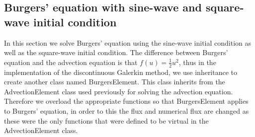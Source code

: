 \documentclass[a4paper, 12pt]{article}
\begin{document}




\subsection{Burgers' equation with sine-wave and square-wave initial condition}

In this section we solve Burgers' equation using the sine-wave initial condition as well as the square-wave initial condition. The difference between Burgers' equation and the advection equation is that $f(u)=\frac{1}{2}u^2$, thus in the implementation of the discontinuous Galerkin method, we use inheritance to create another class named BurgersElement. This class inherits from the AdvectionElement class used previously for solving the advection equation. Therefore we overload the appropriate functions so that BurgersElement applies to Burgers' equation, in order to this the flux and numerical flux are changed as these were the only functions that were defined to be virtual in the AdvectionElement class.    
\end{document}
